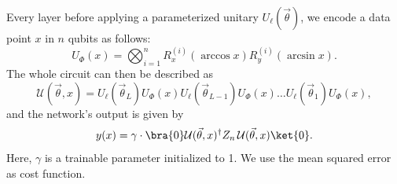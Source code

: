 \documentclass[a4paper,10pt]{article}
\begin{document}
\noindent
Every layer before applying a parameterized unitary $U_\ell(\vec{\theta})$, we encode a data point $x$ in $n$ qubits as follows:
\begin{equation} \label{eq:regression_encode}
U_\Phi(x) = \bigotimes_{i=1}^{n}R_x^{(i)}(\arccos x)R_y^{(i)}(\arcsin x).
\end{equation}
The whole circuit can then be described as
\begin{equation}
\mathcal{U}(\vec{\theta}, x) = U_\ell(\vec{\theta}_L)U_\Phi(x) U_\ell(\vec{\theta}_{L-1})U_\Phi(x) \ldots U_\ell(\vec{\theta}_1)U_\Phi(x),
\end{equation}
and the network's output is given by
\begin{equation}
y(x) = \gamma \cdot \bra{0}\mathcal{U}(\vec{\theta}, x)^\dagger Z_n\, \mathcal{U}(\vec{\theta}, x)\ket{0}.
\end{equation}
Here, $\gamma$ is a trainable parameter initialized to 1.
We use the mean squared error as cost function.
\end{document}
